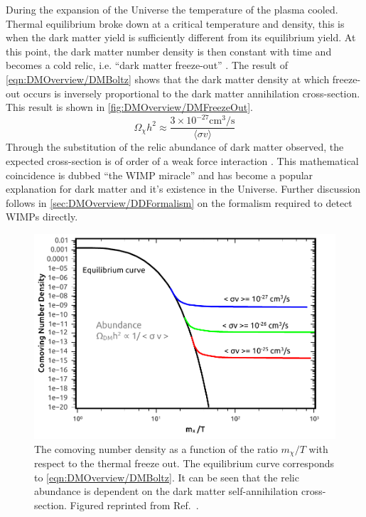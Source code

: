 During the expansion of the Universe the temperature of the plasma cooled. Thermal equilibrium broke down at a critical temperature and density, this is when the dark matter yield is sufficiently different from its equilibrium yield. At this point, the dark matter number density is then constant with time and becomes a cold relic, i.e. ``dark matter freeze-out'' \cite{DMPrimer}. The result of \autoref{eqn:DMOverview/DMBoltz} shows that the dark matter density at which freeze-out occurs is inversely proportional to the dark matter annihilation cross-section. This result is shown in \autoref{fig:DMOverview/DMFreezeOut}. 
\begin{equation}
    \Omega_\chi h^2\approx\frac{3\times10^{-27}\text{cm}^3/\text{s}}{\langle\sigma v\rangle}
\end{equation}
Through the substitution of the relic abundance of dark matter observed, the expected cross-section is of order of a weak force interaction \cite{Arcadi:2017kky}. This mathematical coincidence is dubbed ``the WIMP miracle'' and has become a popular explanation for dark matter and it's existence in the Universe. Further discussion follows in \autoref{sec:DMOverview/DDFormalism} on the formalism required to detect WIMPs directly. %
\begin{figure}[h!]
    \centering
    \includegraphics[width=0.7\linewidth]{figures/DMOverview/abundanceplot.pdf}
    \caption[The comoving number density as a function of the ratio $m_\chi/T$ with respect to the thermal freeze out.]{The comoving number density as a function of the ratio $m_\chi/T$ with respect to the thermal freeze out. The equilibrium curve corresponds to \autoref{eqn:DMOverview/DMBoltz}. It can be seen that the relic abundance is dependent on the dark matter self-annihilation cross-section. Figured reprinted from Ref.~\cite{Arcadi:2017kky}.}
    \label{fig:DMOverview/DMFreezeOut}
\end{figure}
